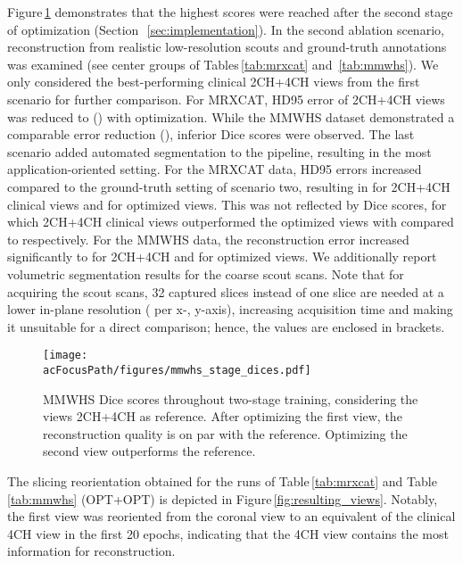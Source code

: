             Figure\,\ref{fig:mmwhs_stage_dices} demonstrates that the highest scores were reached after the second stage of optimization (Section~\,\ref{sec:implementation}).
            In the second ablation scenario, reconstruction from realistic low-resolution scouts and ground-truth annotations was examined (see center groups of Tables\,\ref{tab:mrxcat} and \,\ref{tab:mmwhs}). We only considered the best-performing clinical 2CH+4CH views from the first scenario for further comparison.
            For MRXCAT,  HD95 error of 2CH+4CH views was reduced to  () with optimization.
            While the MMWHS dataset demonstrated a comparable error reduction (), inferior Dice scores were observed.
            The last scenario added automated segmentation to the pipeline, resulting in the most application-oriented setting.
            For the MRXCAT data, HD95 errors increased compared to the ground-truth setting of scenario two, resulting in  for 2CH+4CH clinical views and  for optimized views. This was not reflected by Dice scores, for which 2CH+4CH clinical views outperformed the optimized views with  compared to  respectively.
            For the MMWHS data, the reconstruction error increased significantly to  for 2CH+4CH and  for optimized views.
            We additionally report volumetric segmentation results for the coarse scout scans. Note that for acquiring the scout scans, 32 captured slices instead of one slice are needed at a lower in-plane resolution ( per x-, y-axis), increasing acquisition time and making it unsuitable for a direct comparison; hence, the values are enclosed in brackets.

            \begin{figure}
                \texttt{[image: \\acFocusPath/figures/mmwhs\_stage\_dices.pdf]}
                    \caption{
                    MMWHS Dice scores throughout two-stage training, considering the views 2CH+4CH as reference. After optimizing the first view, the reconstruction quality is on par with the reference. Optimizing the second view outperforms the reference.}
                    \label{fig:mmwhs_stage_dices}
            \end{figure}

            The slicing reorientation obtained for the runs of Table\,\ref{tab:mrxcat} and Table \,\ref{tab:mmwhs} (OPT+OPT) is depicted in Figure\,\ref{fig:resulting_views}. Notably, the first view was reoriented from the coronal view to an equivalent of the clinical 4CH view in the first 20 epochs, indicating that the 4CH view contains the most information for reconstruction.

